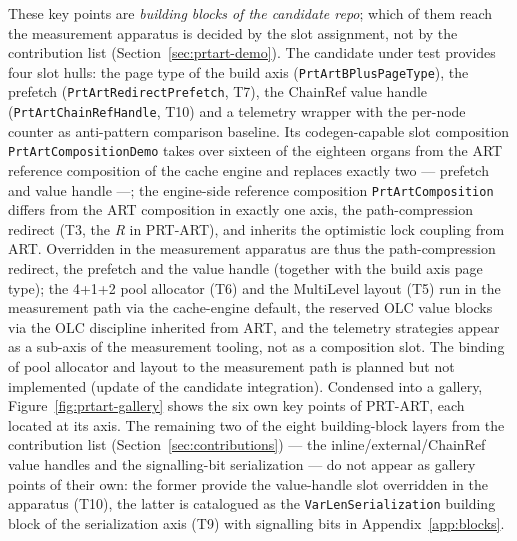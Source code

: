 \begin{nurlang}
These key points are \emph{building blocks of the candidate repo}; which of them reach the measurement
apparatus is decided by the slot assignment, not by the contribution list
(Section~\ref{sec:prtart-demo}). The candidate under test provides four slot hulls: the page type of the build axis
(\texttt{PrtArtBPlusPageType}), the prefetch (\texttt{PrtArtRedirectPrefetch}, T7), the ChainRef value
handle (\texttt{PrtArtChainRefHandle}, T10) and a telemetry wrapper with the per-node counter as
anti-pattern comparison baseline. Its codegen-capable slot composition \texttt{PrtArtCompositionDemo}
takes over sixteen of the eighteen organs from the ART reference composition of the cache engine and
replaces exactly two --- prefetch and value handle ---; the engine-side reference composition
\texttt{PrtArtComposition} differs from the ART composition in exactly one axis, the path-compression
redirect (T3, the \emph{R} in PRT-ART), and inherits the optimistic lock coupling from ART\@.
Overridden in the measurement apparatus are thus the path-compression redirect, the prefetch and the
value handle (together with the build axis page type); the 4+1+2 pool allocator (T6) and the MultiLevel
layout (T5) run in the measurement path via the cache-engine default, the reserved OLC value blocks via
the OLC discipline inherited from ART, and the telemetry strategies appear as a sub-axis of the
measurement tooling, not as a composition slot. The binding of pool allocator and layout to the
measurement path is planned but not implemented (update of the candidate integration).
Condensed into a gallery, Figure~\ref{fig:prtart-gallery} shows the six own key points of PRT-ART,
each located at its axis. The remaining two of the eight building-block layers from the contribution
list (Section~\ref{sec:contributions}) --- the inline/external/ChainRef value handles and the
signalling-bit serialization --- do not appear as gallery points of their own: the former provide the
value-handle slot overridden in the apparatus (T10), the latter is catalogued as the
\texttt{Var\allowbreak{}Len\allowbreak{}Serialization} building block of the serialization axis (T9)
with signalling bits in Appendix~\ref{app:blocks}.
\begin{figure}[htbp]\centering
\begin{tikzpicture}[font=\footnotesize,
  pa/.style={draw,rounded corners,fill=orange!10,minimum width=4.7cm,minimum height=2.25cm,text width=4.4cm,align=center,inner sep=3pt}]

\end{tikzpicture}
\end{figure}
\end{nurlang}
